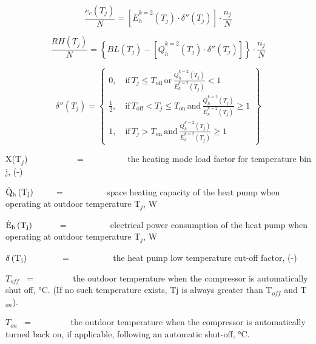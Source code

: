 \begin{equation}
  \frac{e_c(T_j)}{N} = \left[ \dot{E}_h^{k = 2}(T_j) \cdot \delta''(T_j) \right] \cdot \frac{n_j}{N}
\end{equation}

\begin{equation}
  \frac{RH(T_j)}{N} = \left\{ BL(T_j) - \left[\dot{Q}_h^{k = 2}(T_j) \cdot \delta''(T_j) \right] \right\} \cdot \frac{n_j}{N}
\end{equation}

\begin{equation}
\delta''(T_j) = \left\{
\begin{array}{l}
  0,\quad \text{if}\,T_j \le T_{\text{off}} \, \text{or} \, \frac{\dot{Q}_h^{k = 2}(T_j)}{\dot{E}_h^{k=2}(T_j)} < 1 \\
  \frac{1}{2},\quad \text{if}\,T_{\text{off}} < T_j \le T_{\text{on}}\,\text{and}\,\frac{\dot{Q}_h^{k=2}(T_j)}{\dot{E}_h^{k=2}(T_j)} \ge 1 \\
  1,\quad \text{if}\,T_j > T_{\text{on}} \, \text{and} \, \frac{\dot{Q}_h^{k=2}(T_j)}{\dot{E}_h^{k=2}(T_j)} \ge 1
\end{array} \right\}
\end{equation}

X(T\(_{j}\))~~~~~~~~~~~ = ~~~~~~~~~ the heating mode load factor for temperature bin j, (-)

\({{\rm{\dot Q}}_{\rm{h}}}\left( {{{\rm{T}}_{\rm{j}}}} \right)\) ~~~~ = ~~~~~~~~~ space heating capacity of the heat pump when operating at outdoor temperature T\(_{j}\), W

\({{\rm{\dot E}}_{\rm{h}}}\left( {{{\rm{T}}_{\rm{j}}}} \right)\) ~~~~~ = ~~~~~~~~~ electrical power consumption of the heat pump when operating at outdoor temperature T\(_{j}\), W

\({\rm{\delta }}\left( {{{\rm{T}}_{\rm{j}}}} \right)\) ~~~~~~~ = ~~~~~~~~~ the heat pump low temperature cut-off factor, (-)

\(T_{off}\)~ = ~~~~~~~~ the outdoor temperature when the compressor is automatically shut off, °C. (If no such temperature exists, Tj is always greater than T\(_{off}\) and T\(_{on}\)).

\(T_{on}\)~ = ~~~~~~~~ the outdoor temperature when the compressor is automatically turned back on, if applicable, following an automatic shut-off, °C.

